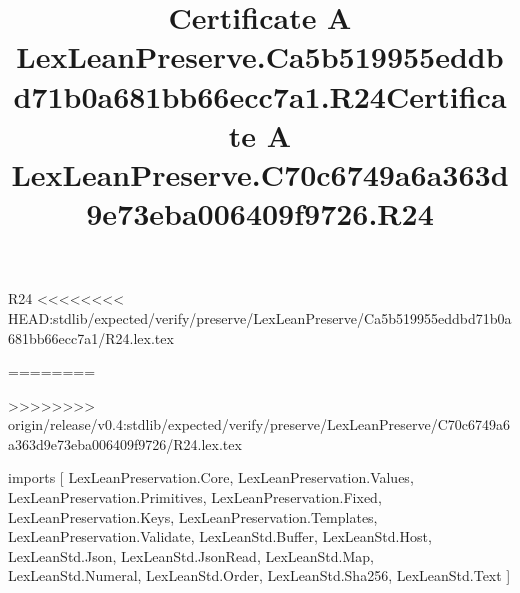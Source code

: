 \begin{lexlean}{R24}
<<<<<<<< HEAD:stdlib/expected/verify/preserve/LexLeanPreserve/Ca5b519955eddbd71b0a681bb66ecc7a1/R24.lex.tex
\title{Certificate A LexLeanPreserve.Ca5b519955eddbd71b0a681bb66ecc7a1.R24}
========
\title{Certificate A LexLeanPreserve.C70c6749a6a363d9e73eba006409f9726.R24}
>>>>>>>> origin/release/v0.4:stdlib/expected/verify/preserve/LexLeanPreserve/C70c6749a6a363d9e73eba006409f9726/R24.lex.tex
\begin{coremodule}
imports [
  LexLeanPreservation.Core,
  LexLeanPreservation.Values,
  LexLeanPreservation.Primitives,
  LexLeanPreservation.Fixed,
  LexLeanPreservation.Keys,
  LexLeanPreservation.Templates,
  LexLeanPreservation.Validate,
  LexLeanStd.Buffer,
  LexLeanStd.Host,
  LexLeanStd.Json,
  LexLeanStd.JsonRead,
  LexLeanStd.Map,
  LexLeanStd.Numeral,
  LexLeanStd.Order,
  LexLeanStd.Sha256,
  LexLeanStd.Text
]


\end{coremodule}
\end{lexlean}
